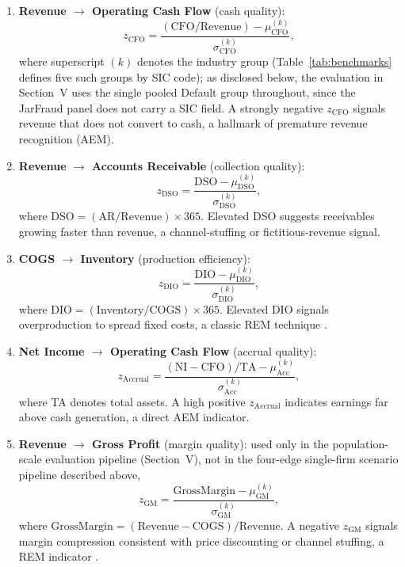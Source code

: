 \documentclass[12pt]{article}
\begin{document}
\begin{enumerate}
    \item \textbf{Revenue $\to$ Operating Cash Flow} (cash quality):
    \begin{equation}
        z_{\text{CFO}} = \frac{(\text{CFO}/\text{Revenue}) - \mu_{\text{CFO}}^{(k)}}{\sigma_{\text{CFO}}^{(k)}},
    \end{equation}
    where superscript $(k)$ denotes the industry group (Table~\ref{tab:benchmarks}
    defines five such groups by SIC code); as disclosed below, the evaluation
    in Section~V uses the single pooled Default group throughout, since the
    JarFraud panel does not carry a SIC field.  A strongly
    negative $z_{\text{CFO}}$ signals revenue that does not convert to
    cash, a hallmark of premature revenue recognition (AEM).

    \item \textbf{Revenue $\to$ Accounts Receivable} (collection quality):
    \begin{equation}
        z_{\text{DSO}} = \frac{\text{DSO} - \mu_{\text{DSO}}^{(k)}}{\sigma_{\text{DSO}}^{(k)}},
    \end{equation}
    where $\text{DSO} = (\text{AR}/\text{Revenue})\times 365$.  Elevated DSO
    suggests receivables growing faster than revenue, a channel-stuffing or
    fictitious-revenue signal.

    \item \textbf{COGS $\to$ Inventory} (production efficiency):
    \begin{equation}
        z_{\text{DIO}} = \frac{\text{DIO} - \mu_{\text{DIO}}^{(k)}}{\sigma_{\text{DIO}}^{(k)}},
    \end{equation}
    where $\text{DIO} = (\text{Inventory}/\text{COGS})\times 365$.  Elevated
    DIO signals overproduction to spread fixed costs, a classic REM technique
    \citep{roychowdhury2006}.

    \item \textbf{Net Income $\to$ Operating Cash Flow} (accrual quality):
    \begin{equation}
        z_{\text{Accrual}} = \frac{(\text{NI} - \text{CFO})/\text{TA} - \mu_{\text{Acc}}^{(k)}}{\sigma_{\text{Acc}}^{(k)}},
    \end{equation}
    where TA denotes total assets.  A high positive $z_{\text{Accrual}}$
    indicates earnings far above cash generation, a direct AEM indicator.

    \item \textbf{Revenue $\to$ Gross Profit} (margin quality): used only
    in the population-scale evaluation pipeline (Section~V), not in the
    four-edge single-firm scenario pipeline described above,
    \begin{equation}
        z_{\text{GM}} = \frac{\text{GrossMargin} - \mu_{\text{GM}}^{(k)}}{\sigma_{\text{GM}}^{(k)}},
    \end{equation}
    where $\text{GrossMargin} = (\text{Revenue}-\text{COGS})/\text{Revenue}$.
    A negative $z_{\text{GM}}$ signals margin compression consistent with
    price discounting or channel stuffing, a REM indicator
    \citep{roychowdhury2006}.
\end{enumerate}
\end{document}
